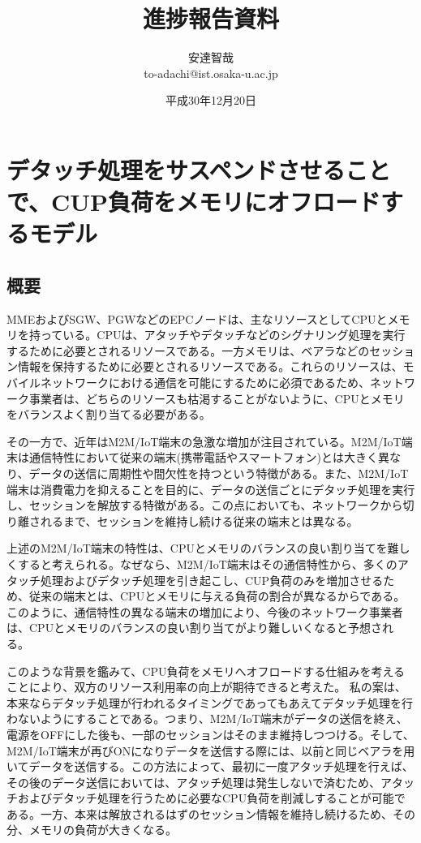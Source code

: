 \documentclass[a4j]{ujarticle}
\title{進捗報告資料}
\author{安達智哉\\to-adachi@ist.osaka-u.ac.jp}
\date{平成30年12月20日}
\begin{document}
\maketitle

\section{デタッチ処理をサスペンドさせることで、CUP負荷をメモリにオフロードするモデル}

\subsection{概要}
MMEおよびSGW、PGWなどのEPCノードは、主なリソースとしてCPUとメモリを持っている。CPUは、アタッチやデタッチなどのシグナリング処理を実行するために必要とされるリソースである。一方メモリは、ベアラなどのセッション情報を保持するために必要とされるリソースである。これらのリソースは、モバイルネットワークにおける通信を可能にするために必須であるため、ネットワーク事業者は、どちらのリソースも枯渇することがないように、CPUとメモリをバランスよく割り当てる必要がある。

その一方で、近年はM2M/IoT端末の急激な増加が注目されている。M2M/IoT端末は通信特性において従来の端末(携帯電話やスマートフォン)とは大きく異なり、データの送信に周期性や間欠性を持つという特徴がある。また、M2M/IoT端末は消費電力を抑えることを目的に、データの送信ごとにデタッチ処理を実行し、セッションを解放する特徴がある。この点においても、ネットワークから切り離されるまで、セッションを維持し続ける従来の端末とは異なる。

上述のM2M/IoT端末の特性は、CPUとメモリのバランスの良い割り当てを難しくすると考えられる。なぜなら、M2M/IoT端末はその通信特性から、多くのアタッチ処理およびデタッチ処理を引き起こし、CUP負荷のみを増加させるため、従来の端末とは、CPUとメモリに与える負荷の割合が異なるからである。このように、通信特性の異なる端末の増加により、今後のネットワーク事業者は、CPUとメモリのバランスの良い割り当てがより難しいくなると予想される。

このような背景を鑑みて、CPU負荷をメモリへオフロードする仕組みを考えることにより、双方のリソース利用率の向上が期待できると考えた。
私の案は、本来ならデタッチ処理が行われるタイミングであってもあえてデタッチ処理を行わないようにすることである。つまり、M2M/IoT端末がデータの送信を終え、電源をOFFにした後も、一部のセッションはそのまま維持しつつける。そして、M2M/IoT端末が再びONになりデータを送信する際には、以前と同じベアラを用いてデータを送信する。この方法によって、最初に一度アタッチ処理を行えば、その後のデータ送信においては、アタッチ処理は発生しないで済むため、アタッチおよびデタッチ処理を行うために必要なCPU負荷を削減しすることが可能である。一方、本来は解放されるはずのセッション情報を維持し続けるため、その分、メモリの負荷が大きくなる。
\end{document}
